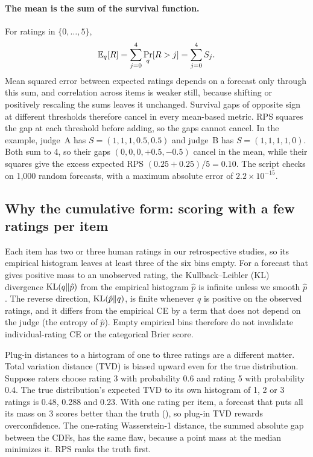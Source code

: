 \paragraph{The mean is the sum of the survival function.}
For ratings in $\{0,\dots,5\}$,
\begin{equation}
\mathbb{E}_q[R]=\sum_{j=0}^{4}\Pr_q[R>j]=\sum_{j=0}^{4}S_j .
\label{eq:mean-survival}
\end{equation}
Mean squared error between expected ratings depends on a forecast only through this sum, and correlation across items is weaker still, because shifting or positively rescaling the sums leaves it unchanged.
Survival gaps of opposite sign at different thresholds therefore cancel in every mean-based metric.
RPS squares the gap at each threshold before adding, so the gaps cannot cancel.
In the example, judge~A has $S=(1,1,1,0.5,0.5)$ and judge~B has $S=(1,1,1,1,0)$.
Both sum to 4, so their gaps $(0,0,0,+0.5,-0.5)$ cancel in the mean, while their squares give the excess expected RPS $(0.25+0.25)/5=0.10$.
The script checks  on 1{,}000 random forecasts, with a maximum absolute error of $2.2\times10^{-15}$.

\subsection{Why the cumulative form: scoring with a few ratings per item}
\label{app:rps-sparse}

Each item has two or three human ratings in our retrospective studies, so its empirical histogram leaves at least three of the six bins empty.
For a forecast that gives positive mass to an unobserved rating, the Kullback--Leibler (KL) divergence $\mathrm{KL}(q\|\hat p)$ from the empirical histogram $\hat p$ is infinite unless we smooth $\hat p$.
The reverse direction, $\mathrm{KL}(\hat p\|q)$, is finite whenever $q$ is positive on the observed ratings, and it differs from the empirical CE by a term that does not depend on the judge (the entropy of $\hat p$).
Empty empirical bins therefore do not invalidate individual-rating CE or the categorical Brier score.

Plug-in distances to a histogram of one to three ratings are a different matter.
Total variation distance (TVD) is biased upward even for the true distribution.
Suppose raters choose rating 3 with probability 0.6 and rating 5 with probability 0.4.
The true distribution's expected TVD to its own histogram of 1, 2 or 3 ratings is 0.48, 0.288 and 0.23.
With one rating per item, a forecast that puts all its mass on 3 scores better than the truth (), so plug-in TVD rewards overconfidence.
The one-rating Wasserstein-1 distance, the summed absolute gap between the CDFs, has the same flaw, because a point mass at the median minimizes it.
RPS ranks the truth first.

